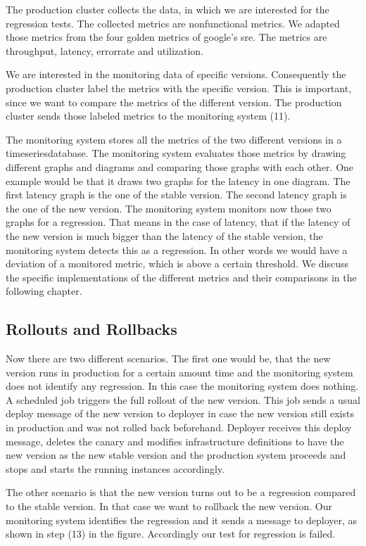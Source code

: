 The production cluster collects the data, in which we are interested for the regression
tests.  The collected metrics are nonfunctional metrics. We adapted those metrics from the
four golden metrics of google's sre. The metrics are throughput, latency, errorrate and
utilization.

We are interested in the monitoring data of specific versions. Consequently the production
cluster label the metrics with the specific version. This is important, since we want to
compare the metrics of the different version.  The production cluster sends those labeled
metrics to the monitoring system (11).

The monitoring system stores all the metrics of the two different versions in a
timeseriesdatabase. The monitoring system evaluates those metrics by drawing different
graphs and diagrams and comparing those graphs with each other. One example would be that
it draws two graphs for the latency in one diagram. The first latency graph is the one of
the stable version. The second latency graph is the one of the new version. The monitoring
system monitors now those two graphs for a regression. That means in the case of latency,
that if the latency of the new version is much bigger than the latency of the stable
version, the monitoring system detects this as a regression. In other words we would have
a deviation of a monitored metric, which is above a certain threshold. We discuss the
specific implementations of the different metrics and their comparisons in the following
chapter.

\subsection{Rollouts and Rollbacks}

Now there are two different scenarios. The first one would be, that the new version runs
in production for a certain amount time and the monitoring system does not identify any
regression. In this case the monitoring system does nothing. A scheduled job triggers the
full rollout of the new version. This job sends a usual deploy message of the new version
to deployer in case the new version still exists in production and was not rolled back
beforehand. Deployer receives this deploy message, deletes the canary and modifies
infrastructure definitions to have the new version as the new stable version and the
production system proceeds and stops and starts the running instances accordingly.

The other scenario is that the new version turns out to be a regression compared to the
stable version. In that case we want to rollback the new version. Our monitoring system
identifies the regression and it sends a message to deployer, as shown in step (13) in the
figure. Accordingly our test for regression is failed.

